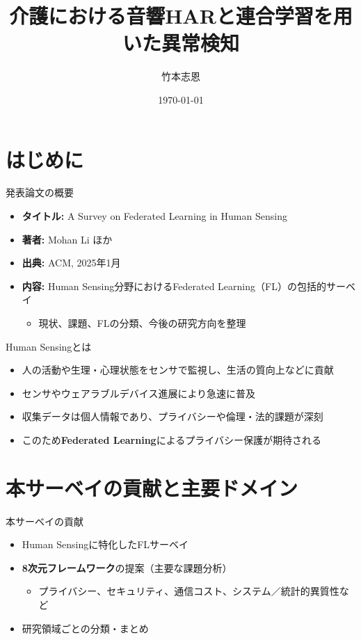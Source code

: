 \documentclass[unicode,12pt,aspectratio=169,dvipdfmx]{beamer}
\title{介護における音響HARと連合学習を用いた異常検知}
\author{竹本志恩}
\institute{INIAD}
\date{\today}
\begin{document}
\begin{frame}
    \titlepage
\end{frame}

\section{はじめに}

\begin{frame}{発表論文の概要}
  \begin{itemize}
    \item \textbf{タイトル:} A Survey on Federated Learning in Human Sensing
    \item \textbf{著者:} Mohan Li ほか
    \item \textbf{出典:} ACM, 2025年1月
    \item \textbf{内容:} Human Sensing分野におけるFederated Learning（FL）の包括的サーベイ
    \begin{itemize}
      \item 現状、課題、FLの分類、今後の研究方向を整理
    \end{itemize}
  \end{itemize}
\end{frame}

\begin{frame}{Human Sensingとは}
  \begin{itemize}
    \item 人の活動や生理・心理状態をセンサで監視し、生活の質向上などに貢献
    \item センサやウェアラブルデバイス進展により急速に普及
    \item 収集データは個人情報であり、プライバシーや倫理・法的課題が深刻
    \item このため\textbf{Federated Learning}によるプライバシー保護が期待される
  \end{itemize}
\end{frame}


\section{本サーベイの貢献と主要ドメイン}

\begin{frame}{本サーベイの貢献}
  \begin{itemize}
    \item Human Sensingに特化したFLサーベイ
    \item \textbf{8次元フレームワーク}の提案（主要な課題分析）
      \begin{itemize}
        \item プライバシー、セキュリティ、通信コスト、システム／統計的異質性など
      \end{itemize}
    \item 研究領域ごとの分類・まとめ
  \end{itemize}
\end{frame}
\end{document}
